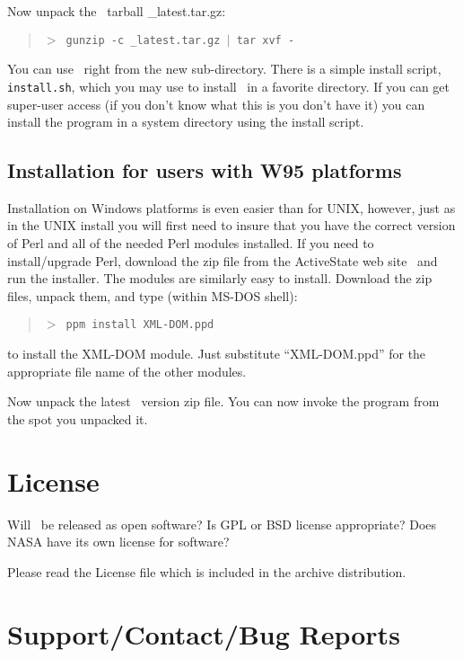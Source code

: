 Now unpack the \program\ tarball \program \_latest.tar.gz:
\begin{quote}
{\tt $>$ gunzip -c \program \_latest.tar.gz $|$ tar xvf - }
\end{quote}

You can use \program\ right from the new sub-directory. There is
a simple install script, {\tt install.sh}, which you may use to
install \program\ in a favorite directory. If 
you can get super-user access (if you don't know what this is
you don't have it) you can install the program in a system
directory using the install script.

\subsection{Installation for users with W95 platforms}

Installation on Windows platforms is even easier than for
UNIX, however, just as in the UNIX install you will first 
need to insure that you have the correct version of Perl and 
all of the needed Perl modules installed.
If you need to install/upgrade Perl, download the zip file from 
the ActiveState web site \activestatewebsite\ and run the
installer. The modules are similarly easy to install. Download
the zip files, unpack them, and type (within MS-DOS shell):
\begin{quote}
{\tt $>$ ppm install XML-DOM.ppd}
\end{quote}
to install the XML-DOM module. Just substitute ``XML-DOM.ppd'' for 
the appropriate file name of the other modules.

Now unpack the latest \program\ version zip file. 
You can now invoke the program from the spot you unpacked it.

\section{License}
\label{sec:license}

Will \program\ be released as open software? Is GPL or BSD license appropriate?
Does NASA have its own license for software?

Please read the License file which is included in the archive distribution.

\section{Support/Contact/Bug Reports}
\label{contact}

